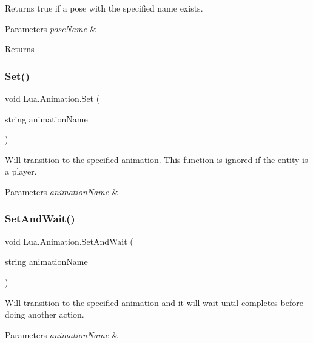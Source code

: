 Returns true if a pose with the specified name exists. 


\begin{DoxyParams}{Parameters}
{\em pose\+Name} & \\
\hline
\end{DoxyParams}
\begin{DoxyReturn}{Returns}

\end{DoxyReturn}
\mbox{\label{class_lua_1_1_animation_a27ca2f8a6b74867c4727315bbce3878f}} 
\subsubsection{\texorpdfstring{Set()}{Set()}}
{\footnotesize\ttfamily void Lua.\+Animation.\+Set (\begin{DoxyParamCaption}\item[{string}]{animation\+Name }\end{DoxyParamCaption})}



Will transition to the specified animation. This function is ignored if the entity is a player. 


\begin{DoxyParams}{Parameters}
{\em animation\+Name} & \\
\hline
\end{DoxyParams}
\mbox{\label{class_lua_1_1_animation_afbab459005c0736f8b52459185cf1637}} 
\subsubsection{\texorpdfstring{SetAndWait()}{SetAndWait()}}
{\footnotesize\ttfamily void Lua.\+Animation.\+Set\+And\+Wait (\begin{DoxyParamCaption}\item[{string}]{animation\+Name }\end{DoxyParamCaption})}



Will transition to the specified animation and it will wait until completes before doing another action. 


\begin{DoxyParams}{Parameters}
{\em animation\+Name} & \\
\hline
\end{DoxyParams}
\mbox{\label{class_lua_1_1_animation_af1f4b9f2d2a3e595a08a7f5e5d095580}} 
